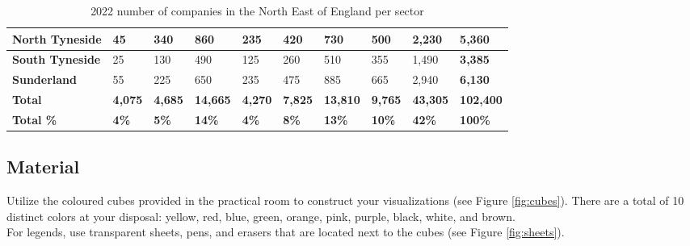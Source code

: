 \documentclass[11pt]{article}
\begin{document}
\begin{table}[h!]
{\begin{tabular}{|l|l|l|l|l|l|l|l|l|l|}
 \hline
 \textbf{North Tyneside} & 45 & 340 & 860 & 235 & 420 & 730 & 500 & 2,230 & \cellcolor{lightgrey}\textbf{5,360} \\
 \hline
 \textbf{South Tyneside} & 25 & 130 & 490 & 125 & 260 & 510 & 355 & 1,490 & \cellcolor{lightgrey}\textbf{3,385} \\
 \hline
 \textbf{Sunderland} & 55 & 225 & 650 & 235 & 475 & 885 & 665 & 2,940 & \cellcolor{lightgrey}\textbf{6,130} \\
 \hline
 \cellcolor{lightgrey}\textbf{Total}  & \cellcolor{lightgrey}\textbf{4,075} & \cellcolor{lightgrey}\textbf{4,685} & \cellcolor{lightgrey}\textbf{14,665} & \cellcolor{lightgrey}\textbf{4,270} & \cellcolor{lightgrey}\textbf{7,825} & \cellcolor{lightgrey}\textbf{13,810} & \cellcolor{lightgrey}\textbf{9,765} & \cellcolor{lightgrey}\textbf{43,305} & \cellcolor{lightgrey}\textbf{102,400} \\
 \hline
 \cellcolor{lightgrey}\textbf{Total \%} & \cellcolor{lightgrey}\textbf{4\%} & \cellcolor{lightgrey}\textbf{5\%} & \cellcolor{lightgrey}\textbf{14\%} & \cellcolor{lightgrey}\textbf{4\%} & \cellcolor{lightgrey}\textbf{8\%} & \cellcolor{lightgrey}\textbf{13\%} & \cellcolor{lightgrey}\textbf{10\%} & \cellcolor{lightgrey}\textbf{42\%} & \cellcolor{lightgrey}\textbf{100\%} \\
 \hline
\end{tabular}
}
    \caption{2022 number of companies in the North East of England per sector}
    \label{tab:data}
\end{table}

\subsection*{Material}

Utilize the coloured cubes provided in the practical room to construct your visualizations (see Figure \ref{fig:cubes}). There are a total of 10 distinct colors at your disposal: yellow, red, blue, green, orange, pink, purple, black, white, and brown.\\

For legends, use transparent sheets, pens, and erasers that are located next to the cubes (see Figure \ref{fig:sheets}).
\end{document}
